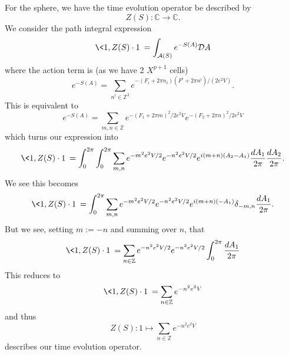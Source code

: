 For the sphere, we have the time evolution operator be described
by
\begin{equation}%
Z(S):\mathbb{C}\to\mathbb{C}.
\end{equation}
We consider the path integral expression
\begin{equation}%
\<1,Z(S)\cdot1\>=\int_{\mathcal{A}(S)}e^{-S(A)}\mathcal{D}A
\end{equation}
where the action term is (as we have 2 $X^{p+1}$ cells)
\begin{equation}%
e^{-S(A)}=\sum_{n^{i}\in\mathbb{Z}^{2}}e^{-(F_{i}+2\pi n_{i})(F^{i}+2\pi n^{i})/(2e^{2}V)}.
\end{equation}
This is equivalent to
\begin{equation}%
e^{-S(A)} = \sum_{m,n\in\mathbb{Z}}e^{-(F_{1}+2\pi
  m)^{2}/2e^{2}V}e^{-(F_{2}+2\pi n)^{2}/2e^{2}V}
\end{equation}
which turns our expression into
\begin{equation}%
\<1,Z(S)\cdot1\> = \int^{2\pi}_{0}\int^{2\pi}_{0}\sum_{m,n}e^{-m^{2}e^{2}V/2}e^{-n^{2}e^{2}V/2}e^{i(m+n)(A_{2}-A_{1})}\frac{dA_{1}}{2\pi}\frac{dA_{2}}{2\pi}.
\end{equation}
We see this becomes
\begin{equation}%
\<1,Z(S)\cdot1\> = \int^{2\pi}_{0}\sum_{m,n}e^{-m^{2}e^{2}V/2}e^{-n^{2}e^{2}V/2}e^{i(m+n)(-A_{1})}\delta_{-m,n}\frac{dA_{1}}{2\pi}.
\end{equation}
But we see, setting $m:=-n$ and summing over $n$, that
\begin{equation}%
\<1,Z(S)\cdot1\>=\sum_{n\in\mathbb{Z}}e^{-n^{2}e^{2}V/2}e^{-n^{2}e^{2}V/2}\int^{2\pi}_{0}\frac{dA_{1}}{2\pi}
\end{equation}
This reduces to
\begin{equation}%
\<1,Z(S)\cdot1\>=\sum_{n\in\mathbb{Z}}e^{-n^{2}e^{2}V}
\end{equation}
and thus
\begin{equation}%
Z(S):1\mapsto\sum_{n\in\mathbb{Z}}e^{-n^{2}e^{2}V}
\end{equation}
describes our time evolution operator.





